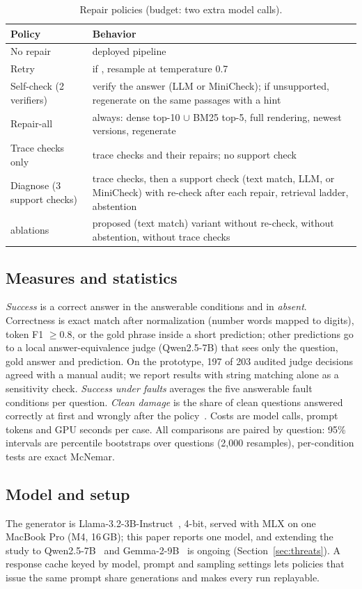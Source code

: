 \begin{table}[t]
\caption{Repair policies (budget: two extra model calls).}\label{tab:policies}
\small
\begin{tabular}{@{}p{2.25cm}p{5.4cm}@{}}
\toprule
Policy & Behavior \\
\midrule
No repair & deployed pipeline \\
Retry & if \INS{}, resample at temperature 0.7 \\
Self-check (2 verifiers) & verify the answer (LLM or MiniCheck); if unsupported, regenerate on the same passages with a hint \\
Repair-all & always: dense top-10 $\cup$ BM25 top-5, full rendering, newest versions, regenerate \\
Trace checks only & trace checks and their repairs; no support check \\
Diagnose (3 support checks) & trace checks, then a support check (text match, LLM, or MiniCheck) with re-check after each repair, retrieval ladder, abstention \\
\quad ablations & proposed (text match) variant without re-check, without abstention, without trace checks \\
\bottomrule
\end{tabular}
\end{table}

\subsection{Measures and statistics}
\emph{Success} is a correct answer in the answerable conditions and \INS{} in
\emph{absent}. Correctness is exact match after normalization (number words mapped to digits),
token F1 $\geq 0.8$, or the gold phrase inside a short prediction; other predictions go to a local
answer-equivalence judge (Qwen2.5-7B) that sees only the question, gold answer and prediction. On
the prototype, 197 of 203 audited judge decisions agreed with a manual audit; we report results with
string matching alone as a sensitivity check. \emph{Success under faults} averages the five
answerable fault conditions per question. \emph{Clean damage} is the share of clean questions
answered correctly at first and wrongly after the policy~\cite{dutta2024accuracy}. Costs are model
calls, prompt tokens and GPU seconds per case. All comparisons are paired by question: 95\% intervals
are percentile bootstraps over questions (2{,}000 resamples), per-condition tests are exact McNemar.

\subsection{Model and setup}
The generator is Llama-3.2-3B-Instruct~\cite{grattafiori2024llama3}, 4-bit, served with MLX on one
MacBook Pro (M4, 16\,GB); this paper reports one model, and extending the study to
Qwen2.5-7B~\cite{qwen2025qwen25} and Gemma-2-9B~\cite{gemma2024gemma2} is ongoing
(Section~\ref{sec:threats}). A response cache keyed by model, prompt and sampling settings lets
policies that issue the same prompt share generations and makes every run replayable.

